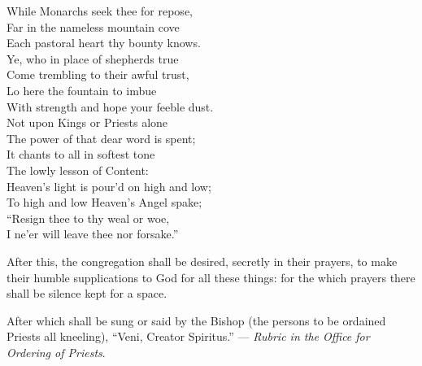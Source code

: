  While Monarchs seek thee for repose, \\
 Far in the nameless mountain cove \\
 Each pastoral heart thy bounty knows. \\
 Ye, who in place of shepherds true \\
 Come trembling to their awful trust, \\
 Lo here the fountain to imbue \\
 With strength and hope your feeble dust. \\
  Not upon Kings or Priests alone \\
 The power of that dear word is spent; \\
 It chants to all in softest tone \\
 The lowly lesson of Content: \\
 Heaven’s light is pour’d on high and low; \\
 To high and low Heaven’s Angel spake; \\
 “Resign thee to thy weal or woe, \\
 I ne’er will leave thee nor forsake.”\\


After this, the congregation shall be desired, secretly in their prayers, to make their humble supplications to God for all these things: for the which prayers there shall be silence kept for a space.

After which shall be sung or said by the Bishop (the persons to be ordained Priests all kneeling), “Veni, Creator Spiritus.” — \emph{Rubric in the Office for Ordering of Priests}.

